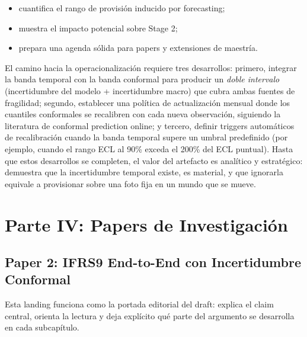 \documentclass[
  spanish,
  11pt,
  letterpaper,
]{scrbook}
\providecommand{\tightlist}{%
  \setlength{\itemsep}{0pt}\setlength{\parskip}{0pt}}
\theoremstyle{plain}
\theoremstyle{remark}
\begin{document}
\begin{itemize}
\tightlist
\item
  cuantifica el rango de provisión inducido por forecasting;
\item
  muestra el impacto potencial sobre Stage 2;
\item
  prepara una agenda sólida para papers y extensiones de maestría.
\end{itemize}

El camino hacia la operacionalización requiere tres desarrollos:
primero, integrar la banda temporal con la banda conformal para producir
un \emph{doble intervalo} (incertidumbre del modelo + incertidumbre
macro) que cubra ambas fuentes de fragilidad; segundo, establecer una
política de actualización mensual donde los cuantiles conformales se
recalibren con cada nueva observación, siguiendo la literatura de
conformal prediction online; y tercero, definir triggers automáticos de
recalibración cuando la banda temporal supere un umbral predefinido (por
ejemplo, cuando el rango ECL al 90\% exceda el 200\% del ECL puntual).
Hasta que estos desarrollos se completen, el valor del artefacto es
analítico y estratégico: demuestra que la incertidumbre temporal existe,
es material, y que ignorarla equivale a provisionar sobre una foto fija
en un mundo que se mueve.

\part{Parte IV: Papers de Investigación}

\chapter{Paper 2: IFRS9 End-to-End con Incertidumbre
Conformal}\label{paper-2-ifrs9-end-to-end-con-incertidumbre-conformal}

\begin{tcolorbox}[enhanced jigsaw, arc=.35mm, bottomrule=.15mm, bottomtitle=1mm, breakable, colback=white, colbacktitle=quarto-callout-important-color!10!white, colframe=quarto-callout-important-color-frame, coltitle=black, left=2mm, leftrule=.75mm, opacityback=0, opacitybacktitle=0.6, rightrule=.15mm, title=\textcolor{quarto-callout-important-color}{\faExclamation}\hspace{0.5em}{Paper autocontenido}, titlerule=0mm, toprule=.15mm, toptitle=1mm]

Esta landing funciona como la portada editorial del draft: explica el
claim central, orienta la lectura y deja explícito qué parte del
argumento se desarrolla en cada subcapítulo.

\end{tcolorbox}
\end{document}
